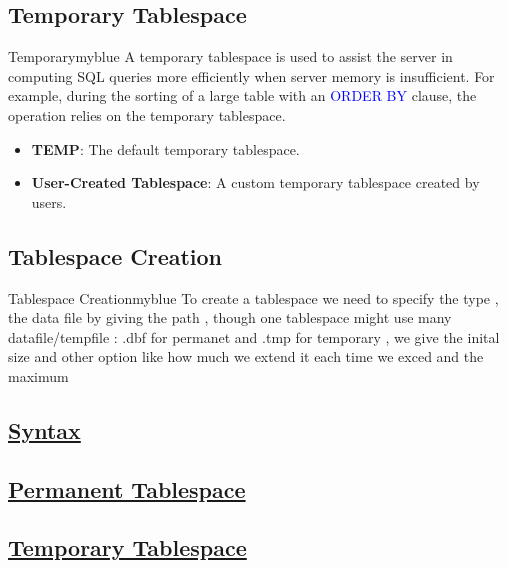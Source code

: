 \subsection{Temporary Tablespace}
\begin{prettyBox}{Temporary}{myblue}
A temporary tablespace is used to assist the server in computing 
SQL queries more efficiently when server memory is insufficient. 
For example, during the sorting of a large table with an \textcolor{blue}{ORDER BY} clause, 
the operation relies on the temporary tablespace.

\begin{itemize}
    \item \textbf{TEMP}: The default temporary tablespace.
    \item \textbf{User-Created Tablespace}: A custom temporary tablespace created by users.
\end{itemize}
\end{prettyBox}

\vspace{0.25cm}

\subsection{Tablespace Creation}
\begin{prettyBox}{Tablespace Creation}{myblue}
To create a tablespace we need to specify the type , the data file by giving the path ,
though one tablespace might use many datafile/tempfile : .dbf for permanet and .tmp for temporary ,
we give the inital size and other option like how much we extend it each time we exced and the maximum
\end{prettyBox}

\vspace{0.25cm}

\subsection*{\underline{Syntax}}

\subsection*{\underline{Permanent Tablespace}}



\subsection*{\underline{Temporary Tablespace}}


